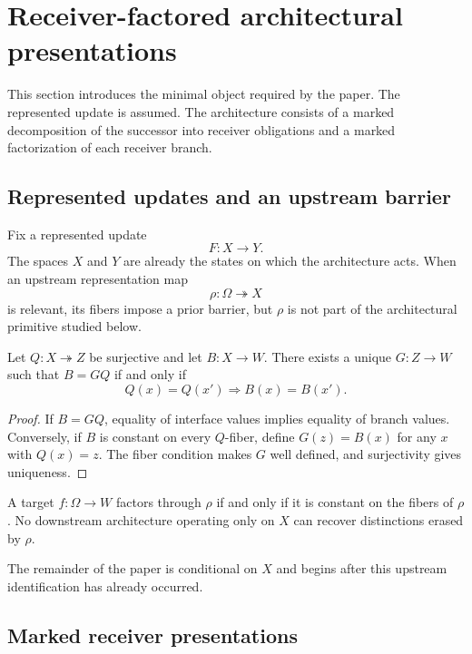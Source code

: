\section{Receiver-factored architectural presentations}\label{sec:receiver-foundation}

This section introduces the minimal object required by the paper. The represented update is assumed. The architecture consists of a marked decomposition of the successor into receiver obligations and a marked factorization of each receiver branch.

\subsection{Represented updates and an upstream barrier}

Fix a represented update
\[
F:X\to Y.
\]
The spaces $X$ and $Y$ are already the states on which the architecture acts. When an upstream representation map
\[
\rho:\Omega\twoheadrightarrow X
\]
is relevant, its fibers impose a prior barrier, but $\rho$ is not part of the architectural primitive studied below.

\begin{lemma}\label{lem:fiber-factorization}
Let $Q:X\twoheadrightarrow Z$ be surjective and let $B:X\to W$. There exists a unique $G:Z\to W$ such that $B=GQ$ if and only if
\[
Q(x)=Q(x')\Longrightarrow B(x)=B(x').
\]
\end{lemma}

\begin{proof}
If $B=GQ$, equality of interface values implies equality of branch values. Conversely, if $B$ is constant on every $Q$-fiber, define $G(z)=B(x)$ for any $x$ with $Q(x)=z$. The fiber condition makes $G$ well defined, and surjectivity gives uniqueness.
\end{proof}

\begin{corollary}\label{cor:representation-barrier}
A target $f:\Omega\to W$ factors through $\rho$ if and only if it is constant on the fibers of $\rho$. No downstream architecture operating only on $X$ can recover distinctions erased by $\rho$.
\end{corollary}

The remainder of the paper is conditional on $X$ and begins after this upstream identification has already occurred.

\subsection{Marked receiver presentations}

